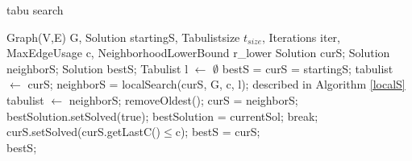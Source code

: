 \documentclass [12pt]{article}
\begin{document}
\begin {algorithm} [H]
\caption {tabu search}
\label {tabusa}
\begin {algorithmic} [3]
\Require Graph(V,E) G, Solution startingS, Tabulistsize $t_{size}$, Iterations iter, MaxEdgeUsage c, NeighborhoodLowerBound r\_lower
\State Solution curS;
\State Solution neighborS;
\State Solution bestS;
\State Tabulist l $\gets$ $\emptyset$
\State bestS = curS = startingS;
\State tabulist $\gets$ curS;
  \State  neighborS = localSearch(curS, G, c, l); \Comment described in Algorithm \ref{localS}
  \State  tabulist $\gets$ neighborS;
    \State removeOldest();
  \EndIf
  \State  curS = neighborS;
    \State bestSolution.setSolved(true);
    \State bestSolution = currentSol;
      \State break; 
    \EndIf
  \EndIf  
    \State curS.setSolved(curS.getLastC()$\leq$c);
    \State bestS = curS;
   \EndIf 
\EndFor\\
\Return bestS;
\end {algorithmic}
\end {algorithm}
\end{document}
